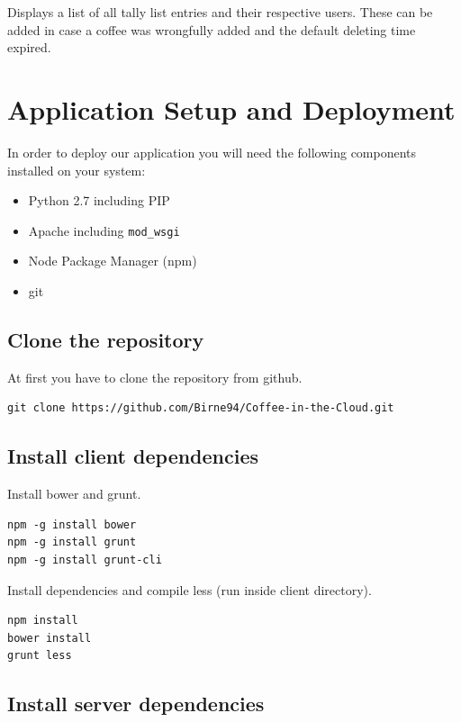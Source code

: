 Displays a list of all tally list entries and their respective users.
These can be added in case a coffee was wrongfully added and the default
deleting time expired.

\newpage
\section{Application Setup and
Deployment}\label{application-setup-and-deployment}

In order to deploy our application you will need the following
components installed on your system:

\begin{itemize}
\item
  Python 2.7 including PIP
\item
  Apache including \texttt{mod\_wsgi}
\item
  Node Package Manager (npm)
\item
  git
\end{itemize}

\subsection{Clone the repository}\label{clone-the-repository}

At first you have to clone the repository from github.

\begin{verbatim}
git clone https://github.com/Birne94/Coffee-in-the-Cloud.git
\end{verbatim}

\subsection{Install client
dependencies}\label{install-client-dependencies}

Install bower and grunt.

\begin{verbatim}
npm -g install bower
npm -g install grunt
npm -g install grunt-cli
\end{verbatim}

Install dependencies and compile less (run inside client directory).

\begin{verbatim}
npm install
bower install
grunt less
\end{verbatim}

\subsection{Install server
dependencies}\label{install-server-dependencies}

